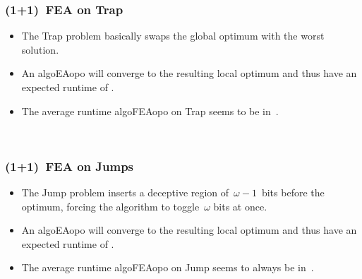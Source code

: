 \documentclass[aspectratio=169,mathserif,notheorems]{beamer}%
\begin{document}
\begin{frame}%
\frametitle{(1+1)~FEA on Trap}%
\parbox{0.37\paperwidth}{%
\begin{itemize}%
\item The Trap problem basically swaps the global optimum with the worst solution\cite{DJW2002OTAOTOPOEA,NB2003AAOTBOSEAOTF}.%
\item<2-> An \gls{algoEAopo} will converge to the resulting local optimum and thus have an expected runtime of .\cite{DJW2002OTAOTOPOEA}%
\item<3-> The average runtime \gls{algoFEAopo} on Trap seems to be in~.%
\end{itemize}%
}\\%
%
%
%
%
%
\end{frame}%
%
\begin{frame}%
\frametitle{(1+1)~FEA on Jumps}%
\parbox{0.37\paperwidth}{%
\begin{itemize}%
\item The Jump problem inserts a deceptive region of~$\omega-1$~bits before the optimum, forcing the algorithm to toggle~$\omega$ bits at once\cite{DJW2002OTAOTOPOEA,FQW2018ELDBOAWHTMO}.%
\item<2-> An \gls{algoEAopo} will converge to the resulting local optimum and thus have an expected runtime of .\cite{DJW2002OTAOTOPOEA}%
\item<3-> The average runtime \gls{algoFEAopo} on Jump seems to \alert{always} be in~.%
\end{itemize}%
}\\%
%
%
%
%
%
\end{frame}%
\end{document}
